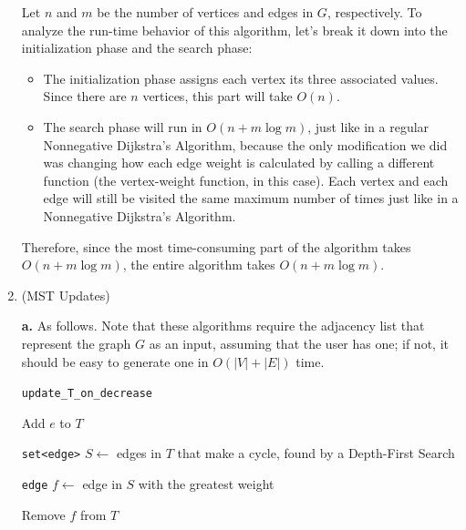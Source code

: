 \documentclass{article}
\begin{document}
\begin{enumerate}
    Let $n$ and $m$ be the number of vertices and edges in $G$, respectively. To analyze the run-time behavior of this algorithm, let's break it down into the initialization phase and the search phase:
    \begin{itemize}
      \item The initialization phase assigns each vertex its three associated values. Since there are $n$ vertices, this part will take $O(n)$.
      \item The search phase will run in $O(n + m\log m)$, just like in a regular Nonnegative Dijkstra's Algorithm, because the only modification we did was changing how each edge weight is calculated by calling a different function (the vertex-weight function, in this case). Each vertex and each edge will still be visited the same maximum number of times just like in a Nonnegative Dijkstra's Algorithm.
    \end{itemize}

    Therefore, since the most time-consuming part of the algorithm takes $O(n + m\log m)$, the entire algorithm takes $O(n + m\log m)$.

    \pagebreak

  \item (MST Updates)

    \textbf{a.} As follows. Note that these algorithms require the adjacency list that represent the graph $G$ as an input, assuming that the user has one; if not, it should be easy to generate one in $O(|V| + |E|)$ time.

    \begin{center}
      \begin{minipage}{\linewidth}
        \renewcommand{\thealgocf}{}
        \begin{algorithm}[H]
          \caption{\texttt{update\_T\_on\_decrease}}


          Add $e$ to $T$

          \texttt{set<edge>} $S \gets$ edges in $T$ that make a cycle, found by a Depth-First Search

          \texttt{edge} $f \gets$ edge in $S$ with the greatest weight

          Remove $f$ from $T$



\end{algorithm}
\end{minipage}
\end{center}
\end{enumerate}
\end{document}
